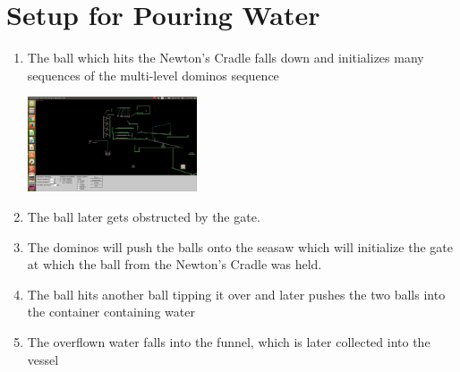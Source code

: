 \documentclass[]{report}
\begin{document}
	\section{Setup for Pouring Water}
\begin{enumerate}
\item The ball which hits the Newton's Cradle falls down and initializes many sequences of the multi-level dominos sequence
\begin{center}
\includegraphics[width=5cm]{img/fifth}
\end{center}
\item The ball later gets obstructed by the gate.
\item The dominos will push the balls onto the seasaw which will initialize the gate at which the ball from the Newton's Cradle was held.  
\item The ball hits another ball tipping it over and later pushes the two balls into the container containing water
\item The overflown water falls into the funnel, which is later collected into the vessel
\end{enumerate}
\newpage
\printbibliography
\nocite{ShareLatex}
\nocite{Box2D}
\nocite{Tutorials_Box2D}
\nocite{Youtube}
\nocite{Github_Conveyor_Belt}
\nocite{General_Problems}
\end{document}
